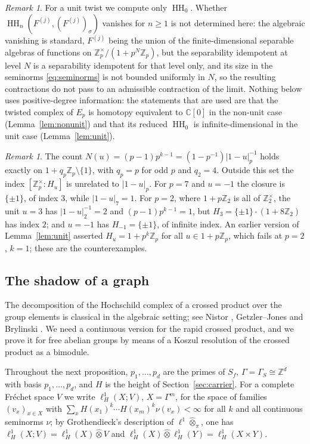 \documentclass[11pt]{amsart}
\theoremstyle{definition}
\theoremstyle{remark}
\newtheorem{remark}[theorem]{Remark}
\newcommand{\C}{\mathbb C}
\newcommand{\Z}{\mathbb Z}
\newcommand{\HH}{\operatorname{HH}}
\begin{document}
\begin{remark}\label{rem:higherdegrees}
For a unit twist we compute only $\HH_0$.  Whether
$\HH_n(F^{(j)},(F^{(j)})_{\sigma})$ vanishes for $n\ge1$ is not determined
here: the algebraic vanishing is standard, $F^{(j)}$ being the union of the
finite-dimensional separable algebras of functions on
$\Z_p^{\times}/(1+p^{N}\Z_p)$, but the separability idempotent at level $N$ is
a separability idempotent for that level only, and its size in the seminorms
\eqref{eq:seminorms} is not bounded uniformly in $N$, so the resulting
contractions do not pass to an admissible contraction of the limit.  Nothing
below uses positive-degree information: the statements that are used are that
the twisted complex of $E_p$ is homotopy equivalent to $\C[0]$ in the non-unit
case (Lemma~\ref{lem:nonunit}) and that its reduced $\HH_0$ is
infinite-dimensional in the unit case (Lemma~\ref{lem:unit}).
\end{remark}

\begin{remark}\label{rem:closure}
The count $N(u)=(p-1)p^{k-1}=(1-p^{-1})|1-u|_p^{-1}$ holds exactly on
$1+q_p\Z_p\setminus\{1\}$, with $q_p=p$ for odd $p$ and $q_2=4$.  Outside this
set the index $[\Z_p^{\times}:H_u]$ is unrelated to $|1-u|_p$.  For $p=7$ and
$u=-1$ the closure is $\{\pm1\}$, of index $3$, while $|1-u|_7=1$.  For $p=2$,
where $1+p\Z_2$ is all of $\Z_2^{\times}$, the unit $u=3$ has $|1-u|_2^{-1}=2$
and $(p-1)p^{k-1}=1$, but $H_3=\{\pm1\}\cdot(1+8\Z_2)$ has index $2$; and
$u=-1$ has $H_{-1}=\{\pm1\}$, of infinite index.  An earlier version of
Lemma~\ref{lem:unit} asserted $H_u=1+p^{k}\Z_p$ for all $u\in1+p\Z_p$, which
fails at $p=2$, $k=1$; these are the counterexamples.
\end{remark}

\subsection{The shadow of a graph}

The decomposition of the Hochschild complex of a crossed product over the
group elements is classical in the algebraic setting; see Nistor
\cite[\S\S3--4]{Nistor}, Getzler--Jones \cite[\S3]{GetzlerJones} and
Brylinski \cite{Brylinski}.  We need a continuous version for the rapid
crossed product, and we prove it for free abelian groups by means of a
Koszul resolution of the crossed product as a bimodule.

Throughout the next proposition, $p_1,\dots,p_d$ are the primes of $S_f$,
$\Gamma=\Gamma_S\cong\Z^{d}$ with basis $p_1,\dots,p_d$, and $H$ is the height
of Section~\ref{sec:carrier}.  For a complete Fr\'echet space $V$ we write
$\ell^{1}_{H}(X;V)$, $X=\Gamma^{m}$, for the space of families
$(v_x)_{x\in X}$ with $\sum_xH(x_1)^{k}\cdots H(x_m)^{k}\nu(v_x)<\infty$ for all
$k$ and all continuous seminorms $\nu$; by Grothendieck's description of
$\ell^{1}\widehat\otimes_{\pi}$, one has
$\ell^{1}_{H}(X;V)=\ell^{1}_{H}(X)\widehat\otimes V$ and
$\ell^{1}_{H}(X)\widehat\otimes\ell^{1}_{H}(Y)=\ell^{1}_{H}(X\times Y)$.
\end{document}
